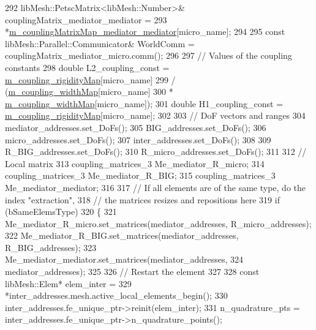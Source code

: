 \begin{DoxyCode}
292         libMesh::PetscMatrix<libMesh::Number>& couplingMatrix\_mediator\_mediator =
293                 *\hyperlink{classcarl_1_1assemble__coupling__matrices_a1a838735ff335cdf1d24403ceab3b896}{m\_couplingMatrixMap\_mediator\_mediator}[micro\_name];
294 
295         \textcolor{keyword}{const} libMesh::Parallel::Communicator& WorldComm = couplingMatrix\_mediator\_micro.comm();
296 
297         \textcolor{comment}{// Values of the coupling constants}
298         \textcolor{keywordtype}{double} L2\_coupling\_const = \hyperlink{classcarl_1_1assemble__coupling__matrices_a2133e2d98a47de9569137f31d69c58ee}{m\_coupling\_rigidityMap}[micro\_name]
299                 / (\hyperlink{classcarl_1_1assemble__coupling__matrices_a72f1024c5634b4e31b8583ee60bb14bc}{m\_coupling\_widthMap}[micro\_name]
300                         * \hyperlink{classcarl_1_1assemble__coupling__matrices_a72f1024c5634b4e31b8583ee60bb14bc}{m\_coupling\_widthMap}[micro\_name]);
301         \textcolor{keywordtype}{double} H1\_coupling\_const = \hyperlink{classcarl_1_1assemble__coupling__matrices_a2133e2d98a47de9569137f31d69c58ee}{m\_coupling\_rigidityMap}[micro\_name];
302 
303         \textcolor{comment}{// DoF vectors and ranges}
304         mediator\_addresses.set\_DoFs();
305         BIG\_addresses.set\_DoFs();
306         micro\_addresses.set\_DoFs();
307         inter\_addresses.set\_DoFs();
308 
309         R\_BIG\_addresses.set\_DoFs();
310         R\_micro\_addresses.set\_DoFs();
311 
312         \textcolor{comment}{// Local matrix}
313         coupling\_matrices\_3 Me\_mediator\_R\_micro;
314         coupling\_matrices\_3 Me\_mediator\_R\_BIG;
315         coupling\_matrices\_3 Me\_mediator\_mediator;
316 
317         \textcolor{comment}{//    If all elements are of the same type, do the index "extraction",}
318         \textcolor{comment}{// the matrices resizes and repositions here}
319         \textcolor{keywordflow}{if} (bSameElemsType)
320         \{
321             Me\_mediator\_R\_micro.set\_matrices(mediator\_addresses, R\_micro\_addresses);
322             Me\_mediator\_R\_BIG.set\_matrices(mediator\_addresses, R\_BIG\_addresses);
323             Me\_mediator\_mediator.set\_matrices(mediator\_addresses,
324                     mediator\_addresses);
325 
326             \textcolor{comment}{// Restart the element}
327 
328             \textcolor{keyword}{const} libMesh::Elem* elem\_inter =
329                     *inter\_addresses.mesh.active\_local\_elements\_begin();
330             inter\_addresses.fe\_unique\_ptr->reinit(elem\_inter);
331             n\_quadrature\_pts = inter\_addresses.fe\_unique\_ptr->n\_quadrature\_points();

\end{DoxyCode}
